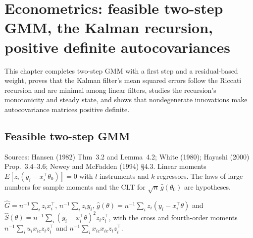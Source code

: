 \chapter{Econometrics: feasible two-step GMM, the Kalman recursion, positive definite autocovariances}
\label{chap:econometrics7}

This chapter completes two-step GMM with a first step and a residual-based weight, proves that the Kalman filter's
mean squared errors follow the Riccati recursion and are minimal among linear filters, studies the recursion's
monotonicity and steady state, and shows that nondegenerate innovations make autocovariance matrices positive definite.

\section{Feasible two-step GMM}
\label{sec:feasible-gmm}

Sources: Hansen (1982) Thm~3.2 and Lemma~4.2; White (1980); Hayashi (2000) Prop.~3.4--3.6; Newey and McFadden (1994)
\S4.3. Linear moments $E[z_i(y_i - x_i^\top\theta_0)] = 0$ with $l$ instruments and $k$ regressors. The laws of large
numbers for sample moments and the CLT for $\sqrt n\,\hat g(\theta_0)$ are hypotheses.

\begin{definition}
\label{def:sample-moments}
\leanok
$\hat G = n^{-1}\sum_iz_ix_i^\top$, $n^{-1}\sum_iz_iy_i$, $\hat g(\theta) = n^{-1}\sum_iz_i(y_i - x_i^\top\theta)$ and
$\hat S(\theta) = n^{-1}\sum_i(y_i - x_i^\top\theta)^2z_iz_i^\top$, with the cross and fourth-order moments
$n^{-1}\sum_iu_ix_{ic}z_iz_i^\top$ and $n^{-1}\sum_ix_{ic}x_{ie}z_iz_i^\top$.
\end{definition}

